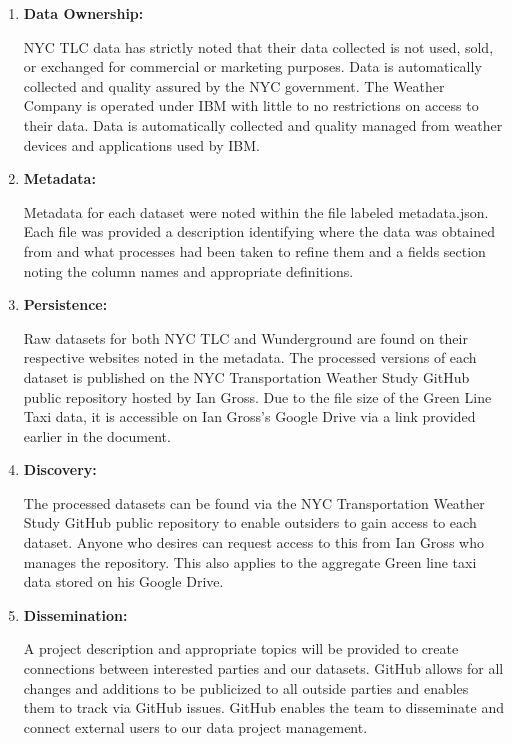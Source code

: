 \documentclass{article}
\begin{document}
\begin{enumerate}
\begin{enumerate}
        \item
        \textbf{Data Ownership:}

        NYC TLC data has strictly noted that their data collected is not used, sold, or exchanged for commercial or marketing purposes. Data is automatically collected and quality assured by the NYC government. The Weather Company is operated under IBM with little to no restrictions on access to their data. Data is automatically collected and quality managed from weather devices and applications used by IBM.


        \item
        \textbf{Metadata:}

        Metadata for each dataset were noted within the file labeled metadata.json. Each file was provided a description identifying where the data was obtained from and what processes had been taken to refine them and a fields section noting the column names and appropriate definitions.


        \item
        \textbf{Persistence:}

        Raw datasets for both NYC TLC and Wunderground are found on their respective websites noted in the metadata. The processed versions of each dataset is published on the NYC Transportation Weather Study GitHub public repository hosted by Ian Gross. Due to the file size of the Green Line Taxi data, it is accessible on Ian Gross's Google Drive via a link provided earlier in the document.


        \item
        \textbf{Discovery:}

        The processed datasets can be found via the NYC Transportation Weather Study GitHub public repository to enable outsiders to gain access to each dataset. Anyone who desires can request access to this from Ian Gross who manages the repository. This also applies to the aggregate Green line taxi data stored on his Google Drive.


        \item
        \textbf{Dissemination:}

        A project description and appropriate topics will be provided to create connections between interested parties and our datasets. GitHub allows for all changes and additions to be publicized to all outside parties and enables them to track via GitHub issues. GitHub enables the team to disseminate and connect external users to our data project management.


    \end{enumerate}



\end{enumerate}
\end{document}
